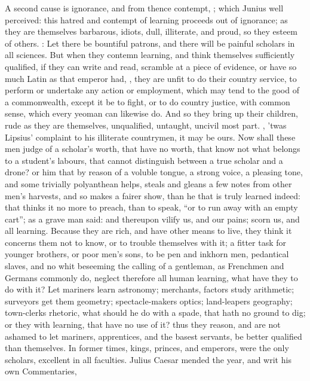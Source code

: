 A second cause is ignorance, and from thence contempt, ; which Junius well perceived:
this hatred and contempt of learning proceeds out of
ignorance; as they are themselves barbarous, idiots, dull,
illiterate, and proud, so they esteem of others. : Let there be bountiful patrons, and there will be
painful scholars in all sciences. But when they contemn learning, and think
themselves sufficiently qualified, if they can write and read, scramble at a
piece of evidence, or have so much Latin as that emperor had, , they are unfit to do their
country service, to perform or undertake any action or employment, which may
tend to the good of a commonwealth, except it be to fight, or to do country
justice, with common sense, which every yeoman can likewise do. And so they
bring up their children, rude as they are themselves, unqualified, untaught,
uncivil most part. ,
\etc{} 'twas Lipsius' complaint to his illiterate countrymen, it may be ours.
Now shall these men judge of a scholar's worth, that have no worth, that know
not what belongs to a student's labours, that cannot distinguish between a true
scholar and a drone? or him that by reason of a voluble tongue, a strong voice,
a pleasing tone, and some trivially polyanthean helps, steals and gleans a few
notes from other men's harvests, and so makes a fairer show, than he that is
truly learned indeed: that thinks it no more to preach, than to speak,
\enquote{or to run away with an empty cart}; as a grave man said:
and thereupon vilify us, and our pains; scorn us, and all learning.
Because they are rich, and have other means to live, they
think it concerns them not to know, or to trouble themselves with it; a fitter
task for younger brothers, or poor men's sons, to be pen and inkhorn men,
pedantical slaves, and no whit beseeming the calling of a gentleman, as
Frenchmen and Germans commonly do, neglect therefore all human learning, what
have they to do with it? Let mariners learn astronomy; merchants, factors study
arithmetic; surveyors get them geometry; spectacle-makers optics; land-leapers
geography; town-clerks rhetoric, what should he do with a spade, that hath no
ground to dig; or they with learning, that have no use of it? thus they reason,
and are not ashamed to let mariners, apprentices, and the basest servants, be
better qualified than themselves. In former times, kings, princes, and
emperors, were the only scholars, excellent in all faculties. Julius Caesar
mended the year, and writ his own Commentaries,

